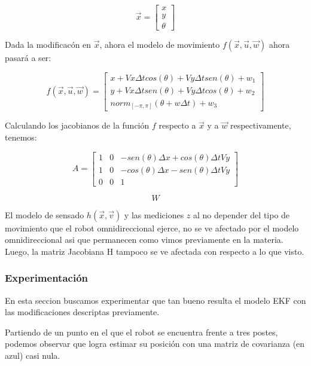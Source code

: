 $$\overrightarrow{x} = \begin{bmatrix}
         x \\
         y \\
         \theta 
        \end{bmatrix}$$

Dada la modificacón en $\overrightarrow{x}$, ahora el modelo de movimiento $f(\overrightarrow{x},\overrightarrow{u}, \overrightarrow{w})$ ahora pasará a ser:

$$f(\overrightarrow{x},\overrightarrow{u}, \overrightarrow{w})= \begin{bmatrix}
         x + Vx \Delta t cos(\theta) + Vy \Delta t sen(\theta) + w_1 \\
         y + Vx \Delta t sen(\theta) + Vy \Delta t cos(\theta) + w_2 \\
         norm_{[-\pi,\pi]} (\theta + w \Delta t) + w_3
         \end{bmatrix}$$

Calculando los jacobianos de la función $f$ respecto a $\overrightarrow{x}$ y a $\overrightarrow{w}$ respectivamente, tenemos:

$$A= \begin{bmatrix}
         1 & 0 & -sen(\theta)\Delta x + cos(\theta) \Delta t V y\\
         1 & 0 & -cos(\theta)\Delta x - sen(\theta) \Delta t V y \\
         0 & 0 & 1
         \end{bmatrix}$$

$$W$$

El modelo de sensado $h(\overrightarrow{x},\overrightarrow{v})$ y las mediciones $z$ al no depender del tipo de movimiento que el robot omnidireccional ejerce, no se ve afectado por el modelo omnidireccional asi que permanecen como vimos previamente en la materia. Luego, la matriz Jacobiana H tampoco se ve afectada con respecto a lo que visto.


\subsubsection{Experimentación}

En esta seccion buscamos experimentar que tan bueno resulta el modelo EKF con las modificaciones descriptas previamente.

Partiendo de un punto en el que el robot se encuentra frente a tres postes, podemos observar que logra estimar su posición con una matriz de covarianza (en azul) casi nula.

